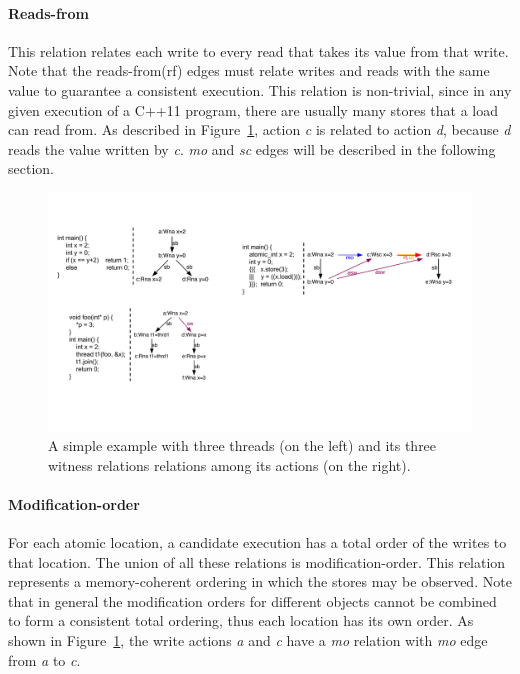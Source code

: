 \documentclass[preprint, numbers, 10pt]{sigplanconf}
\begin{document}
\paragraph{Reads-from}

This relation relates each write to every read that takes its value 
from that write. Note that the reads-from(rf) edges must relate writes 
and reads with the same value to guarantee a consistent execution. 
This relation is non-trivial, since in any given execution of a C++11 program, 
there are usually many stores that a load can read from. As described in
Figure~\ref{fig:rf_relation}, action \textit{c} is related to action \textit{d},
because \textit{d} reads the value written by \textit{c}. \textit{mo} and 
\textit{sc} edges will be described in the following section.  

\begin{figure}%
\centering\includegraphics[scale=0.5]{rf_Relation.pdf} %
\caption{A simple example with three threads (on the left) and 
its three witness relations relations among its actions (on the right).}
\label{fig:rf_relation}
\end{figure}

\paragraph{Modification-order}

For each atomic location, a candidate execution has a total order 
of the writes to that location. The union of all these relations 
is modification-order. This relation represents a memory-coherent
ordering in which the stores may be observed. 
Note that in general the modification orders for different objects 
cannot be combined to form a consistent total ordering, 
thus each location has its own order. As shown in Figure~\ref{fig:rf_relation},
the write actions \textit{a} and \textit{c} have a \textit{mo} relation with
\textit{mo} edge from \textit{a} to \textit{c}. 
\end{document}
